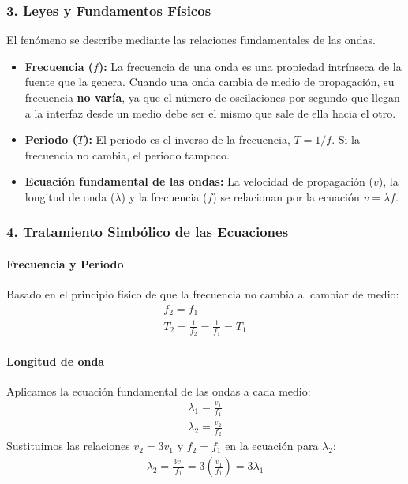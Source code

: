 \subsubsection*{3. Leyes y Fundamentos Físicos}
El fenómeno se describe mediante las relaciones fundamentales de las ondas.
\begin{itemize}
    \item \textbf{Frecuencia ($f$):} La frecuencia de una onda es una propiedad intrínseca de la fuente que la genera. Cuando una onda cambia de medio de propagación, su frecuencia \textbf{no varía}, ya que el número de oscilaciones por segundo que llegan a la interfaz desde un medio debe ser el mismo que sale de ella hacia el otro.
    \item \textbf{Periodo ($T$):} El periodo es el inverso de la frecuencia, $T = 1/f$. Si la frecuencia no cambia, el periodo tampoco.
    \item \textbf{Ecuación fundamental de las ondas:} La velocidad de propagación ($v$), la longitud de onda ($\lambda$) y la frecuencia ($f$) se relacionan por la ecuación $v = \lambda f$.
\end{itemize}

\subsubsection*{4. Tratamiento Simbólico de las Ecuaciones}
\paragraph{Frecuencia y Periodo}
Basado en el principio físico de que la frecuencia no cambia al cambiar de medio:
\begin{gather}
    f_2 = f_1 \\
    T_2 = \frac{1}{f_2} = \frac{1}{f_1} = T_1
\end{gather}

\paragraph{Longitud de onda}
Aplicamos la ecuación fundamental de las ondas a cada medio:
\begin{gather}
    \lambda_1 = \frac{v_1}{f_1} \\
    \lambda_2 = \frac{v_2}{f_2}
\end{gather}
Sustituimos las relaciones $v_2 = 3v_1$ y $f_2 = f_1$ en la ecuación para $\lambda_2$:
\begin{gather}
    \lambda_2 = \frac{3v_1}{f_1} = 3 \left(\frac{v_1}{f_1}\right) = 3\lambda_1
\end{gather}

